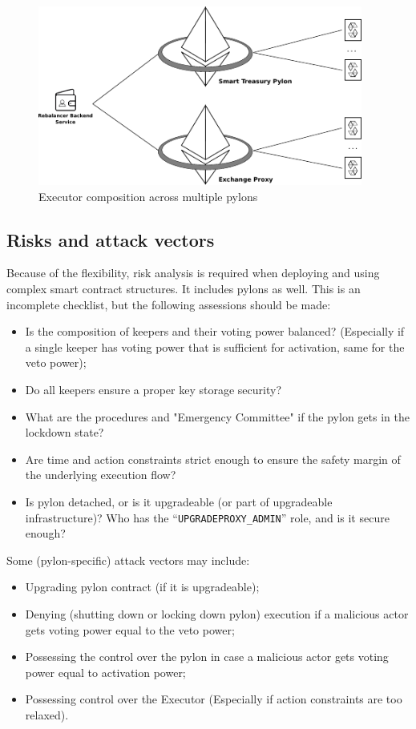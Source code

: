 \documentclass[12pt]{article}
\begin{document}
\begin{figure}[h!]
  \begin{center}
    \includegraphics[width=0.95\textwidth]{pylon_executor_composition.pdf}
    \caption[Figure 1]{Executor composition across multiple pylons
    \label{fig:pylon_executor_composition}}
  \end{center}
\end{figure}


\pagebreak
\subsection{Risks and attack vectors}

Because of the flexibility, risk analysis is required when deploying and using complex smart contract structures. It includes pylons as well.
This is an incomplete checklist, but the following assessions should be made:
\begin{itemize}
\item{Is the composition of keepers and their voting power balanced? (Especially if a single keeper has voting power that is sufficient for activation, same for the veto power);}
\item{Do all keepers ensure a proper key storage security?}
\item{What are the procedures and "Emergency Committee" if the pylon gets in the lockdown state?}
\item{Are time and action constraints strict enough to ensure the safety margin of the underlying execution flow?}
\item{Is pylon detached, or is it upgradeable (or part of upgradeable infrastructure)? Who has the ``\texttt{UPGRADEPROXY\_ADMIN}'' role, and is it secure enough?}
\end{itemize}

Some (pylon-specific) attack vectors may include:
\begin{itemize}
\item{Upgrading pylon contract (if it is upgradeable);}
\item{Denying (shutting down or locking down pylon) execution if a malicious actor gets voting power equal to the veto power;}
\item{Possessing the control over the pylon in case a malicious actor gets voting power equal to activation power;}
\item{Possessing control over the Executor (Especially if action constraints are too relaxed).}
\end{itemize}
\end{document}

